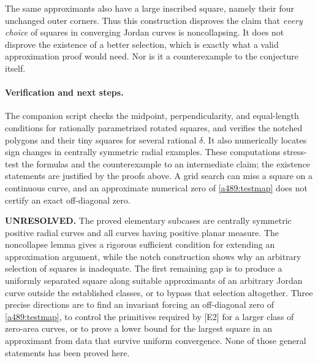 \documentclass[11pt]{article}
\begin{document}
The same approximants also have a large inscribed square, namely their
four unchanged outer corners. Thus this construction disproves the claim
that \emph{every choice} of squares in converging Jordan curves is
noncollapsing. It does not disprove the existence of a better selection,
which is exactly what a valid approximation proof would need. Nor is it
a counterexample to the conjecture itself.

\paragraph{Verification and next steps.}
The companion script checks the midpoint, perpendicularity, and equal-length
conditions for rationally parametrized rotated squares, and verifies the
notched polygons and their tiny squares for several rational $\delta$.
It also numerically locates sign changes in centrally symmetric radial
examples. These computations stress-test the formulas and the counterexample
to an intermediate claim; the existence statements are justified by the
proofs above. A grid search can miss a square on a continuous curve, and
an approximate numerical zero of \eqref{a489:testmap} does not certify an
exact off-diagonal zero.

\textbf{UNRESOLVED.} The proved elementary subcases are centrally symmetric
positive radial curves and all curves having positive planar measure.
The noncollapse lemma gives a rigorous sufficient condition for extending
an approximation argument, while the notch construction shows why an
arbitrary selection of squares is inadequate. The first remaining gap is
to produce a uniformly separated square along suitable approximants of
an arbitrary Jordan curve outside the established classes, or to bypass
that selection altogether. Three precise directions are to find an invariant
forcing an off-diagonal zero of \eqref{a489:testmap}, to control the primitives
required by [E2] for a larger class of zero-area curves, or to prove a lower
bound for the largest square in an approximant from data that survive
uniform convergence. None of those general statements has been proved here.
\end{document}
